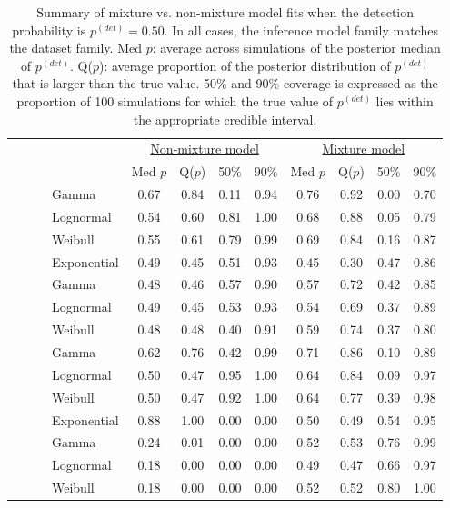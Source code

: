 \documentclass[useAMS,usenatbib,referee,12pt]{article}
\newcommand{\pdet}{p^{(det)}}
\begin{document}
\begin{table}[ht]
\footnotesize\centering
\begin{tabular}{l|l|l|l|cccc|cccc}
 \multicolumn{4}{c|}{ } & \multicolumn{4}{c|}{\underline{Non-mixture model}} & \multicolumn{4}{c}{\underline{Mixture model}} \\
 \multicolumn{4}{c|}{ } & Med $p$ & Q($p$) & 50\% & 90\% & Med $p$ & Q($p$) & 50\% & 90\% \\ 
  \hline
  \hline
 \parbox[t]{2mm}{} & \parbox[t]{2mm}{} & \parbox[t]{2mm}{} & Gamma & 0.67 & 0.84 & 0.11 & 0.94 & 0.76 & 0.92 & 0.00 & 0.70 \\ 
   &  &  & Lognormal & 0.54 & 0.60 & 0.81 & 1.00 & 0.68 & 0.88 & 0.05 & 0.79 \\ 
   &  &  & Weibull & 0.55 & 0.61 & 0.79 & 0.99 & 0.69 & 0.84 & 0.16 & 0.87 \\ 
 & & &  Exponential & 0.49 & 0.45 & 0.51 & 0.93 & 0.45 & 0.30 & 0.47 & 0.86 \\ 
 & & \parbox[t]{2mm}{} & Gamma & 0.48 & 0.46 & 0.57 & 0.90 & 0.57 & 0.72 & 0.42 & 0.85 \\ 
   &  &  & Lognormal & 0.49 & 0.45 & 0.53 & 0.93 & 0.54 & 0.69 & 0.37 & 0.89 \\ 
   &  &  & Weibull & 0.48 & 0.48 & 0.40 & 0.91 & 0.59 & 0.74 & 0.37 & 0.80 \\ 
& \parbox[t]{2mm}{} & \parbox[t]{2mm}{} & Gamma & 0.62 & 0.76 & 0.42 & 0.99 & 0.71 & 0.86 & 0.10 & 0.89 \\ 
   &  &  & Lognormal & 0.50 & 0.47 & 0.95 & 1.00 & 0.64 & 0.84 & 0.09 & 0.97 \\ 
   &  &  & Weibull & 0.50 & 0.47 & 0.92 & 1.00 & 0.64 & 0.77 & 0.39 & 0.98 \\ 
 & & &   Exponential & 0.88 & 1.00 & 0.00 & 0.00 & 0.50 & 0.49 & 0.54 & 0.95 \\ 
 & & \parbox[t]{2mm}{} & Gamma & 0.24 & 0.01 & 0.00 & 0.00 & 0.52 & 0.53 & 0.76 & 0.99 \\ 
   &  &  & Lognormal & 0.18 & 0.00 & 0.00 & 0.00 & 0.49 & 0.47 & 0.66 & 0.97 \\ 
   &  &  & Weibull & 0.18 & 0.00 & 0.00 & 0.00 & 0.52 & 0.52 & 0.80 & 1.00 \\ 
   \hline
\end{tabular}
\caption{Summary of mixture vs. non-mixture model fits when the detection probability is $\pdet =0.50$.  
In all cases, the inference model family matches the dataset family.  
Med $p$: average across simulations of the posterior median of $\pdet$.  
Q($p$): average proportion of the posterior distribution of $\pdet$ that is larger than the true value.  
50\% and 90\% coverage is expressed as the proportion of 100 simulations for which the true value of $\pdet$ lies within the appropriate credible interval.}
\label{tbl:mix50}


\end{table}
\end{document}
